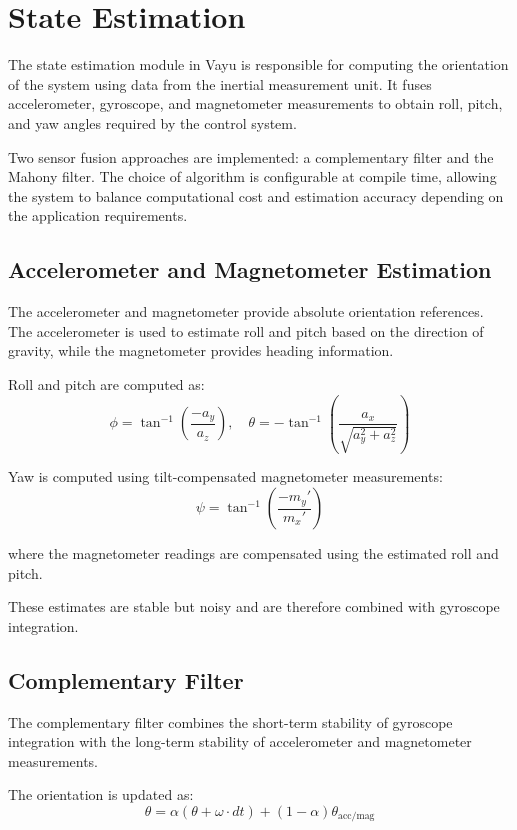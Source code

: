 \section{State Estimation}
\label{sec:vayu_estimation}

The state estimation module in Vayu is responsible for computing the orientation of the system using data from the inertial measurement unit. It fuses accelerometer, gyroscope, and magnetometer measurements to obtain roll, pitch, and yaw angles required by the control system.

Two sensor fusion approaches are implemented: a complementary filter and the Mahony filter. The choice of algorithm is configurable at compile time, allowing the system to balance computational cost and estimation accuracy depending on the application requirements.

\subsection{Accelerometer and Magnetometer Estimation}

The accelerometer and magnetometer provide absolute orientation references. The accelerometer is used to estimate roll and pitch based on the direction of gravity, while the magnetometer provides heading information.

Roll and pitch are computed as:
\[
\phi = \tan^{-1}\left(\frac{-a_y}{a_z}\right), \quad
\theta = -\tan^{-1}\left(\frac{a_x}{\sqrt{a_y^2 + a_z^2}}\right)
\]

Yaw is computed using tilt-compensated magnetometer measurements:
\[
\psi = \tan^{-1}\left(\frac{-m_y'}{m_x'}\right)
\]

where the magnetometer readings are compensated using the estimated roll and pitch.

These estimates are stable but noisy and are therefore combined with gyroscope integration.

\subsection{Complementary Filter}

The complementary filter combines the short-term stability of gyroscope integration with the long-term stability of accelerometer and magnetometer measurements.

The orientation is updated as:
\[
\theta = \alpha \left(\theta + \omega \cdot dt \right) + (1 - \alpha)\theta_{\text{acc/mag}}
\]

